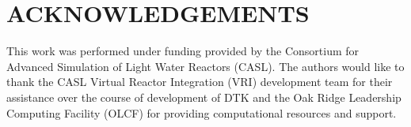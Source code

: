 \documentclass{mc2013}
\begin{document}
\section*{ACKNOWLEDGEMENTS}

This work was performed under funding provided by the Consortium for
Advanced Simulation of Light Water Reactors (CASL). The authors would
like to thank the CASL Virtual Reactor Integration (VRI) development
team for their assistance over the course of development of DTK and
the Oak Ridge Leadership Computing Facility (OLCF) for providing
computational resources and support.

\setlength{\baselineskip}{12pt}


\end{document}
